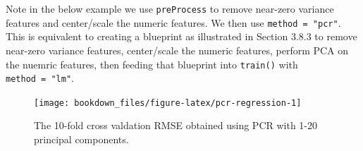 \documentclass[]{krantz}
\makeatletter
\newenvironment{Shaded}{\begin{snugshade}}{\end{snugshade}}
\newcommand{\CommentTok}[1]{\textcolor[rgb]{0.37,0.37,0.37}{\textit{#1}}}
\newcommand{\DataTypeTok}[1]{\textcolor[rgb]{0.27,0.27,0.27}{#1}}
\newcommand{\DecValTok}[1]{\textcolor[rgb]{0.06,0.06,0.06}{#1}}
\newcommand{\KeywordTok}[1]{\textcolor[rgb]{0.27,0.27,0.27}{\textbf{#1}}}
\newcommand{\NormalTok}[1]{#1}
\newcommand{\OperatorTok}[1]{\textcolor[rgb]{0.43,0.43,0.43}{\textbf{#1}}}
\newcommand{\StringTok}[1]{\textcolor[rgb]{0.5,0.5,0.5}{#1}}
\newenvironment{kframe}{%
\medskip{}
\setlength{\fboxsep}{.8em}
 \def\at@end@of@kframe{}%
 \ifinner\ifhmode%
  \def\at@end@of@kframe{\end{minipage}}%
  \begin{minipage}{\columnwidth}%
 \fi\fi%
 \def\FrameCommand##1{\hskip\@totalleftmargin \hskip-\fboxsep
 \colorbox{shadecolor}{##1}\hskip-\fboxsep
     \hskip-\linewidth \hskip-\@totalleftmargin \hskip\columnwidth}%
 \MakeFramed {\advance\hsize-\width
   \@totalleftmargin\z@ \linewidth\hsize
   \@setminipage}}%
 {\par\unskip\endMakeFramed%
 \at@end@of@kframe}
\newenvironment{block}[1]
  {
  \begin{itemize}
  \renewcommand{\labelitemi}{
    \raisebox{-.7\height}[0pt][0pt]{
      {\setkeys{Gin}{width=3em,keepaspectratio}\texttt{[image: icons/\#1]}}
    }
  }
  \setlength{\fboxsep}{1em}
  \begin{kframe}
  \item
  }
  {
  \end{kframe}
  \end{itemize}
  }
\newenvironment{note}
  {\begin{block}{note}}
  {\end{block}}
\renewenvironment{Shaded}{\begin{kframe}}{\end{kframe}}
\makeatother
\begin{document}
\begin{note}
Note in the below example we use \texttt{preProcess} to remove near-zero
variance features and center/scale the numeric features. We then use
\texttt{method\ =\ "pcr"}. This is equivalent to creating a blueprint as
illustrated in Section 3.8.3 to remove near-zero variance features,
center/scale the numeric features, perform PCA on the nuemric features,
then feeding that blueprint into \texttt{train()} with
\texttt{method\ =\ "lm"}.
\end{note}

\begin{Shaded}
\end{Shaded}

\begin{figure}

{\centering \texttt{[image: bookdown\_files/figure-latex/pcr-regression-1]} 

}

\caption{The 10-fold cross valdation RMSE obtained using PCR with 1-20 principal components.}\label{fig:pcr-regression}
\end{figure}
\end{document}
